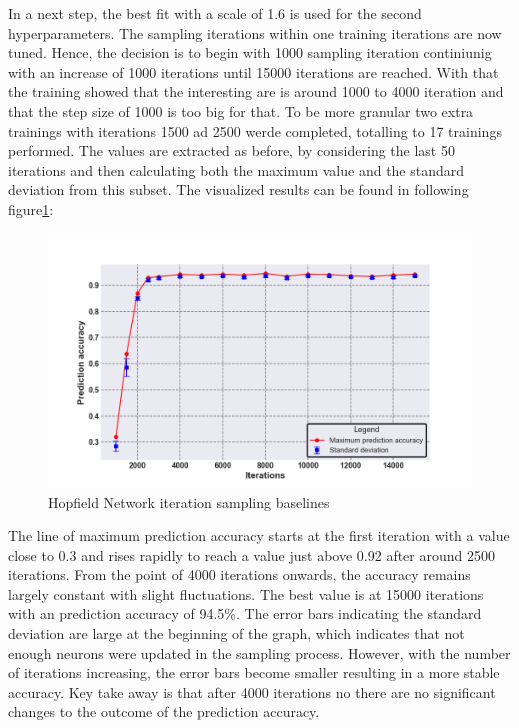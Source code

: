 In a next step, the best fit with a scale of 1.6 is used for the second hyperparameters. 
The sampling iterations within one training iterations are now tuned.
Hence, the decision is to begin with 1000 sampling iteration continiunig with an increase of 1000 iterations until 15000 iterations are reached. 
With that the training showed that the interesting are is around 1000 to 4000 iteration and that the step size of 1000 is too big for that. 
To be more granular two extra trainings with iterations 1500 ad 2500 werde completed, totalling to 17 trainings performed.
The values are extracted as before, by considering the last 50 iterations and then calculating both the maximum value and the standard deviation from this subset.
The visualized results can be found in following figure\ref{Hyperparamers_Iteraions_ohne}:
\begin{figure}[H]
    \centering
    \includegraphics[width=1\linewidth]{graphics/Iterations_Ohne_N2_Half_Pred_Acc.png}
    \caption{Hopfield Network iteration sampling baselines}
    \label{Hyperparamers_Iteraions_ohne}
\end{figure}
The line of maximum prediction accuracy starts at the first iteration with a value close to 0.3 and rises rapidly to reach a value just above 0.92 after around 2500 iterations.
From the point of 4000 iterations onwards, the accuracy remains largely constant with slight fluctuations.
The best value is at 15000 iterations with an prediction accuracy of 94.5\%.
The error bars indicating the standard deviation are large at the beginning of the graph, which indicates that not enough neurons were updated in the sampling process.
However, with the number of iterations increasing, the error bars become smaller resulting in a more stable accuracy.
Key take away is that after 4000 iterations no there are no significant changes to the outcome of the prediction accuracy.

